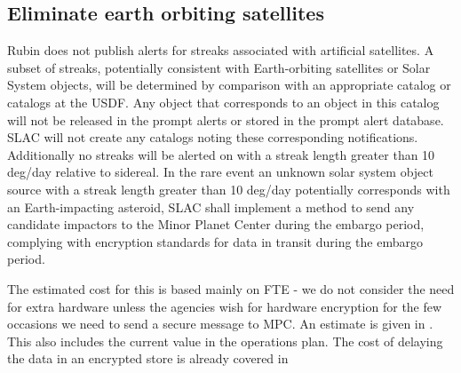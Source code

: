 
\subsection{Eliminate earth orbiting satellites} \label{sec:4eliminate}

Rubin does not publish alerts for streaks associated with artificial satellites.
A subset of streaks, potentially consistent with Earth-orbiting satellites or Solar System objects,
will be determined by comparison with an appropriate catalog or catalogs at the \gls{USDF}.
Any object that corresponds to an object in this catalog will not be released in the  prompt
alerts or stored in the prompt alert database.
SLAC will not create any catalogs noting these corresponding notifications.
Additionally no streaks will be  alerted on with a streak length greater than 10 deg/day relative to sidereal.
In the rare event an unknown solar system object source with a streak  length greater than 10 deg/day potentially corresponds with an Earth-impacting asteroid, SLAC shall implement a method to send any candidate  impactors to the Minor Planet Center during the embargo period, complying with encryption standards for data in transit during the embargo  period.

The estimated cost for this is based mainly on FTE - we do not consider the need for extra hardware unless the agencies wish for hardware encryption for the few occasions we need to send a secure message to \gls{MPC}.
An estimate is given in . This also includes the current value in the operations plan.
The cost of delaying the data in an encrypted store is already covered in 




